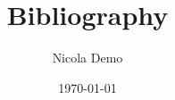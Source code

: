 \documentclass{article}
\begin{document}
\title{Bibliography}
\author{Nicola Demo}
\date{\today}

\maketitle

\nocite{*}
\printbibliography
\end{document}
